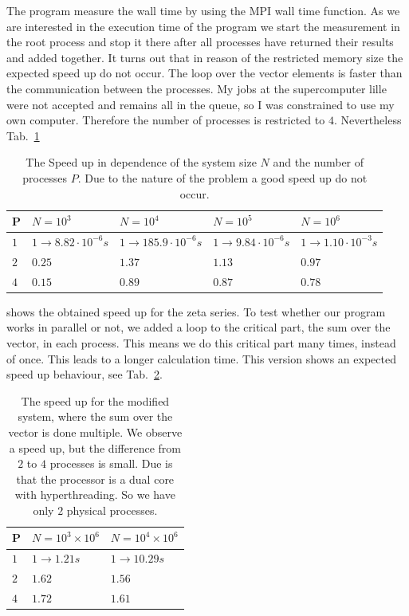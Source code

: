The program measure the wall time by using the MPI wall time function. As we are interested in the execution time of the program we start the measurement in the root process and stop it there after all processes have returned their results and added together. It turns out that in reason of the restricted memory size the expected speed up do not occur. The loop over the vector elements is faster than the communication between the processes. My jobs at the supercomputer lille were not accepted and remains all in the queue, so I was constrained to use my own computer. Therefore the number of processes is restricted to $4$. Nevertheless Tab.~\ref{tab:speed_up1_mpi}\begin{table}
\centering
    \begin{tabular}{| l | l | l | l | l |}
    
    \hline
    P & $N = 10^3$ & $N = 10^4$ & $N = 10^5$ & $N = 10^6$\\  \hline
	$1$ & $1 \rightarrow 8.82 \cdot 10^{-6} s$ & $1 \rightarrow 185.9 \cdot 10^{-6} s$ & $1 \rightarrow 9.84 \cdot 10^{-6} s$ & $1 \rightarrow 1.10 \cdot 10^{-3} s$\\    
    $2$ & $0.25$ & $1.37$ & $1.13$ &$0.97$ \\
    $4$ & $0.15$ & $0.89$ & $0.87$ &$0.78$ \\
    \hline
    
    \end{tabular}
    \caption{The Speed up in dependence of the system size $N$ and the number of processes $P$. Due to the nature of the problem a good speed up do not occur.}
    \label{tab:speed_up1_mpi}
\end{table} shows the obtained speed up for the zeta series.
To test whether our program works in parallel or not, we added a loop to the critical part, the sum over the vector, in each process. This means we do this critical part many times, instead of once. This leads to a longer calculation time. This version shows an expected speed up behaviour, see Tab.~\ref{tab:speed_up2}.\begin{table}
\centering
    \begin{tabular}{| l | l | l |}
    
    \hline
    P & $N = 10^3 \times 10^6$ & $N = 10^4 \times 10^6$ \\  \hline
	$1$ & $1 \rightarrow 1.21 s$ & $1 \rightarrow 10.29 s$\\    
    $2$ & $1.62$ & $1.56$\\
    $4$ & $1.72$ & $1.61$\\
    \hline
    
    \end{tabular}
    \caption{The speed up for the modified system, where the sum over the vector is done multiple. We observe a speed up, but the difference from $2$ to $4$ processes is small. Due is that the processor is a dual core with hyperthreading. So we have only $2$ physical processes.}
    \label{tab:speed_up2}
\end{table}





